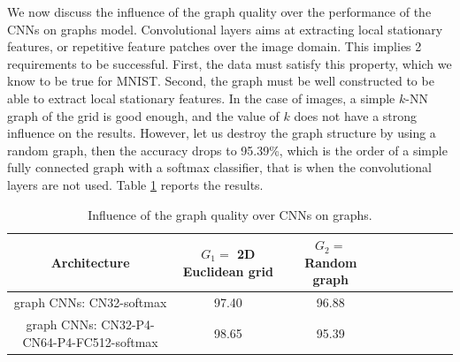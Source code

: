 \documentclass{article}
\begin{document}
\noindent
We now discuss the influence of the graph quality over the performance of the CNNs on graphs model. Convolutional layers aims at extracting local stationary features, or repetitive feature patches over the image domain. This implies 2 requirements to be successful. First, the data must satisfy this property, which we know to be true for MNIST. Second, the graph must be well constructed to be able to extract local stationary features. In the case of images, a simple $k$-NN graph of the grid is good enough, and the value of $k$ does not have a strong influence on the results. However, let us destroy the graph structure by using a random graph, then the accuracy drops to 95.39\%, which is the order of a simple fully connected graph with a softmax classifier, that is when the convolutional layers are not used. Table \ref{tab3} reports the results.


\begin{table}[h!]
 \centering
{\small
\begin{tabular}{|c|c|c|c|c|c|c|c|c|}
\hline
 Architecture & $G_1=$ 2D Euclidean grid  & $G_2=$ Random graph \\
\hline
graph CNNs: CN32-softmax & 97.40 & 96.88\\
graph CNNs: CN32-P4-CN64-P4-FC512-softmax & 98.65 & 95.39 \\
\hline
\end{tabular}
}
\caption{Influence of the graph quality over CNNs on graphs.} 
\label{tab3}
\end{table}
















\end{document}
